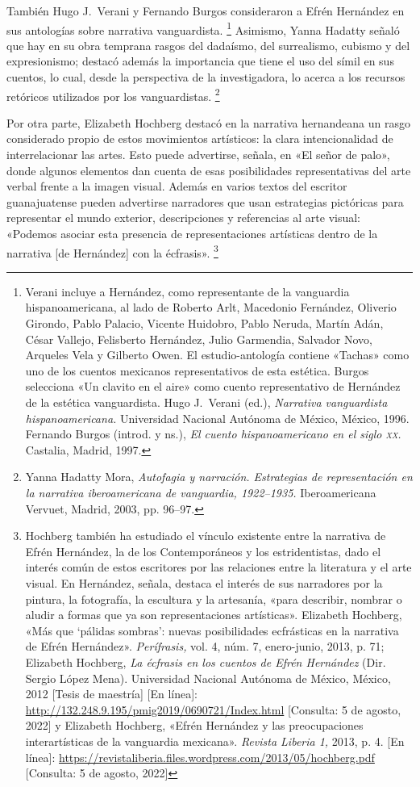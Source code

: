 \documentclass[14pt,twoside,final]{extbook} %
\let\oldfootnote\footnote
\renewcommand\footnote[1]{%
\oldfootnote{\hspace{1mm}#1}}
\begin{document}
También Hugo J.~Verani y Fernando Burgos consideraron a Efrén Hernández en sus antologías sobre narrativa vanguardista.\footnote{Verani incluye a Hernández, como representante de la vanguardia hispanoamericana, al lado de Roberto Arlt, Macedonio Fernández, Oliverio Girondo, Pablo Palacio, Vicente Huidobro, Pablo Neruda, Martín Adán, César Vallejo, Felisberto Hernández, Julio Garmendia, Salvador Novo, Arqueles Vela y Gilberto Owen. El estudio-antología contiene «Tachas» como uno de los cuentos mexicanos representativos de esta estética. Burgos selecciona «Un clavito en el aire» como cuento representativo de Hernández de la estética vanguardista. Hugo J.~Verani (ed.), \emph{Narrativa vanguardista hispanoamericana.} Universidad Nacional Autónoma de México, México, 1996. Fernando Burgos (introd. y ns.), \emph{El cuento hispanoamericano en el siglo \textsc{xx}.} Castalia, Madrid, 1997.} Asimismo, Yanna Hadatty señaló que hay en su obra temprana rasgos del dadaísmo, del surrealismo, cubismo y del expresionismo; destacó además la importancia que tiene el uso del símil en sus cuentos, lo cual, desde la perspectiva de la investigadora, lo acerca a los recursos retóricos utilizados por los vanguardistas.\footnote{Yanna Hadatty Mora, \emph{Autofagia y narración. Estrategias de representación en la narrativa iberoamericana de vanguardia, 1922--1935.} Iberoamericana Vervuet, Madrid, 2003, pp. 96--97.}

Por otra parte, Elizabeth Hochberg destacó en la narrativa hernandeana un rasgo considerado propio de estos movimientos artísticos: la clara intencionalidad de interrelacionar las artes. Esto puede advertirse, señala, en «El señor de palo», donde algunos elementos dan cuenta de esas posibilidades representativas del arte verbal frente a la imagen visual. Además en varios textos del escritor guanajuatense pueden advertirse narradores que usan estrategias pictóricas para representar el mundo exterior, descripciones y referencias al arte visual: «Podemos asociar esta presencia de representaciones artísticas dentro de la narrativa [de Hernández] con la écfrasis».\footnote{Hochberg también ha estudiado el vínculo existente entre la narrativa de Efrén Hernández, la de los Contemporáneos y los estridentistas, dado el interés común de estos escritores por las relaciones entre la literatura y el arte visual. En Hernández, señala, destaca el interés de sus narradores por la pintura, la fotografía, la escultura y la artesanía, «para describir, nombrar o aludir a formas que ya son representaciones artísticas». Elizabeth Hochberg, «Más que `pálidas sombras': nuevas posibilidades ecfrásticas en la narrativa de Efrén Hernández». \emph{Perífrasis,} vol. 4, núm. 7, enero-junio, 2013, p. 71; Elizabeth Hochberg, \emph{La écfrasis en los cuentos de Efrén Hernández} (Dir. Sergio López Mena). Universidad Nacional Autónoma de México, México, 2012 [Tesis de maestría] [En línea]: \url{http://132.248.9.195/pmig2019/0690721/Index.html} [Consulta: 5 de agosto, 2022] y Elizabeth Hochberg, «Efrén Hernández y las preocupaciones interartísticas de la vanguardia mexicana». \emph{Revista Liberia 1,} 2013, p. 4. [En línea]: \url{https://revistaliberia.files.wordpress.com/2013/05/hochberg.pdf} [Consulta: 5 de agosto, 2022]}
\end{document}
